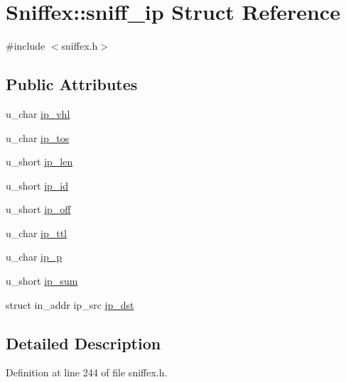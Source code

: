 \hypertarget{struct_sniffex_1_1sniff__ip}{}\section{Sniffex\+:\+:sniff\+\_\+ip Struct Reference}
\label{struct_sniffex_1_1sniff__ip}


{\ttfamily \#include $<$sniffex.\+h$>$}

\subsection*{Public Attributes}
\begin{DoxyCompactItemize}
\item 
u\+\_\+char \mbox{\hyperlink{struct_sniffex_1_1sniff__ip_a64daddec106d5178ffbfe2f07378e438}{ip\+\_\+vhl}}
\item 
u\+\_\+char \mbox{\hyperlink{struct_sniffex_1_1sniff__ip_a2cfa668bb5e7079cc05e0d19d95b3816}{ip\+\_\+tos}}
\item 
u\+\_\+short \mbox{\hyperlink{struct_sniffex_1_1sniff__ip_a8ae9deed5b399601307bca07dc59054a}{ip\+\_\+len}}
\item 
u\+\_\+short \mbox{\hyperlink{struct_sniffex_1_1sniff__ip_a98026bc0aad86b837f246635ed9b25df}{ip\+\_\+id}}
\item 
u\+\_\+short \mbox{\hyperlink{struct_sniffex_1_1sniff__ip_aa66ee179c411c56586369198edcc7b43}{ip\+\_\+off}}
\item 
u\+\_\+char \mbox{\hyperlink{struct_sniffex_1_1sniff__ip_aea2468d9918eb811586acb71de6870ef}{ip\+\_\+ttl}}
\item 
u\+\_\+char \mbox{\hyperlink{struct_sniffex_1_1sniff__ip_a2c06fbd06dc42564a398cec20a6b15b9}{ip\+\_\+p}}
\item 
u\+\_\+short \mbox{\hyperlink{struct_sniffex_1_1sniff__ip_ab50c5a07d672683f1039ba5edcd7d583}{ip\+\_\+sum}}
\item 
struct in\+\_\+addr ip\+\_\+src \mbox{\hyperlink{struct_sniffex_1_1sniff__ip_abf8550a1a90663dc9f529f50ecee72ee}{ip\+\_\+dst}}
\end{DoxyCompactItemize}


\subsection{Detailed Description}


Definition at line 244 of file sniffex.\+h.



